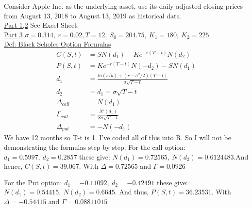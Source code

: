 \documentclass[12pt]{article}
\newenvironment{problem}[3][Problem]{\begin{trivlist}
\item[\hskip \labelsep {\bfseries #1}\hskip \labelsep {\bfseries #2.}]}{\end{trivlist}}
\begin{document}
\newpage
\begin{problem}{4}. Consider Apple Inc. as the underlying asset, use its daily adjusted closing prices from August 13, 2018 to August 13, 2019 as historical data.\\
\underline{Part 1,2} See Excel Sheet.  \\
\underline{Part 3} $\sigma = 0.314, \ r=0.02, T= 12 , \ S_0 = 204.75, \ K_1 = 180, \ K_2 = 225$. \\
\underline{Def: Black Scholes Option Formulas} 
\begin{align*}
C(S,t) &= SN(d_1)-Ke^{-r(T-t)}N(d_2) \\
P(S,t) &= Ke^{-r(T-t)}N(-d_2)-SN(d_1) \\
d_1 &= \frac{ln(s/k) + (r-\sigma^2/2)(T-t)}{\sigma \sqrt{T-t}} \\
d_2 &= d_1 = \sigma \sqrt{T-t}\\
\Delta_{call} &= N(d_1) \\
\Gamma_{call} &= \frac{N'(d_1)}{S\sigma \sqrt{T-t}} \\
\Delta_{put} &= -N(-d_1) 
\end{align*}
We have 12 months so T-t is 1. I've coded all of this into R. So I will not be demonstrating the formulas step by step. For the call option: $d_1 = 0.5997, \ d_2 = 0.2857 $ these give: $N(d_1)=0.72565, \ N(d_2) = 0.6124483$.And hence, $C(S,t) =  39.067$. With $\Delta = 0.72565 $ and $\Gamma = 0.0926 $ 

For the Put option: $d_1 = -0.11092, \ d_2 = -0.42491$ these give: $N(d_1)=0.54415, \ N(d_2) = 0.6645 $. And thus, $P(S,t)=36.23531. $ With $\Delta = -0.54415 $ and $\Gamma = 0.08811015$ \\
\end{problem}
\end{document}
